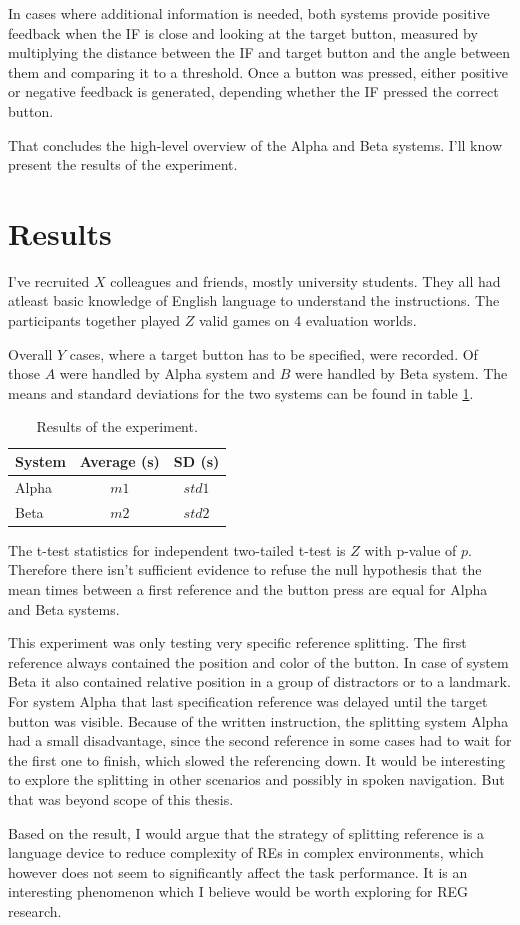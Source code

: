 In cases where additional information is needed, both systems provide positive feedback when the IF is close and looking at the target button, measured by multiplying the distance between the IF and target button and the angle between them and comparing it to a threshold. Once a button was pressed, either positive or negative feedback is generated, depending whether the IF pressed the correct button.

That concludes the high-level overview of the Alpha and Beta systems. I'll know present the results of the experiment.

\section{Results}
I've recruited $X$ colleagues and friends, mostly university students. They all had atleast basic knowledge of English language to understand the instructions. The participants together played $Z$ valid games on 4 evaluation worlds.

Overall $Y$ cases, where a target button has to be specified, were recorded. Of those $A$ were handled by Alpha system and $B$ were handled by Beta system. The means and standard deviations for the two systems can be found in table \ref{tab:meanexper}.

\begin{table}[!htbp]
 \centering
\begin{tabular}{lcc}
\toprule
System   & Average (s) & SD (s)  \\
\midrule
Alpha   & $m1$ & $std1$ \\
Beta 	& $m2$ & $std2$ \\
\bottomrule
\end{tabular}
\caption{Results of the experiment.}
\label{tab:meanexper}
\end{table}

The t-test statistics for independent two-tailed t-test is $Z$ with p-value of $p$. Therefore there isn't sufficient evidence to refuse the null hypothesis that the mean times between a first reference and the button press are equal for Alpha and Beta systems.

This experiment was only testing very specific reference splitting. The first reference always contained the position and color of the button. In case of system Beta it also contained relative position in a group of distractors or to a landmark. For system Alpha that last specification reference was delayed until the target button was visible. Because of the written instruction, the splitting system Alpha had a small disadvantage, since the second reference in some cases had to wait for the first one to finish, which slowed the referencing down. It would be interesting to explore the splitting in other scenarios and possibly in spoken navigation. But that was beyond scope of this thesis.

Based on the result, I would argue that the strategy of splitting reference is a language device to reduce complexity of REs in complex environments, which however does not seem to significantly affect the task performance. It is an interesting phenomenon which I believe would be worth exploring for REG research.